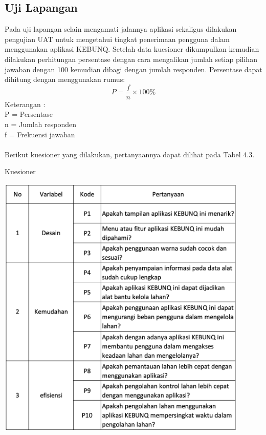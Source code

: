 \begin{flushleft}
\begin{justify}
        \subsection{Uji Lapangan}
        Pada uji lapangan selain mengamati jalannya aplikasi sekaligus dilakukan pengujian UAT untuk mengetahui tingkat penerimaan pengguna dalam menggunakan aplikasi KEBUNQ.
        Setelah data kuesioner dikumpulkan kemudian dilakukan perhitungan persentase dengan cara mengalikan jumlah setiap pilihan jawaban 
        dengan 100 kemudian dibagi dengan jumlah responden. Persentase dapat dihitung dengan menggunakan rumus:
        \begin{equation}
            P = \frac{f}{n} \times 100\%
         \end{equation}
         \noindent Keterangan :
         \\P = Persentase
         \\n = Jumlah responden
         \\f = Frekuensi jawaban\\\\
         Berikut kuesioner yang dilakukan, pertanyaannya dapat dilihat pada Tabel 4.3.
         \begin{table}[ht]
            \centering
            \caption{Kuesioner}
            \includegraphics[width=12cm]{images/bab 4/uat.png}\\
            \end{table}

\end{justify}
\end{flushleft}
